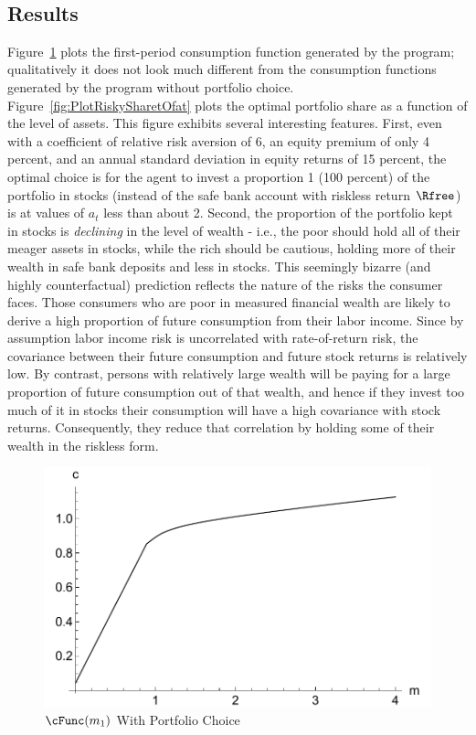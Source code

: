 \documentclass[titlepage, headings=optiontotocandhead]{\econtex}
\begin{document}
\
\subsection{Results}

Figure~\ref{fig:PlotctMultContr} plots the first-period consumption
function generated by the program; qualitatively it does not look much
different from the consumption functions generated by the program
without portfolio choice.  Figure~\ref{fig:PlotRiskySharetOfat} plots the
optimal portfolio share as a function of the level of assets.  This
figure exhibits several interesting features.  First, even with a
coefficient of relative risk aversion of 6, an equity premium of only
4 percent, and an annual standard deviation in equity returns of 15
percent, the optimal choice is for the agent
to invest a proportion 1 (100 percent) of the portfolio in stocks (instead of the safe bank account with riskless return $\Rfree$) is
at values of ${a}_{t}$ less than about 2.  Second, the
proportion of the portfolio kept in stocks is \textit{declining} in the
level of wealth - i.e., the poor should hold all of their meager
assets in stocks, while the rich should be cautious, holding more of
their wealth in safe bank deposits and less in stocks.  This
seemingly bizarre (and highly counterfactual) prediction reflects the
nature of the risks the consumer faces.  Those consumers who are poor
in measured financial wealth are likely to derive a high proportion of
future consumption from their labor income.  Since by assumption labor
income risk is uncorrelated with rate-of-return risk, the covariance
between their future consumption and future stock returns is
relatively low.  By contrast, persons with relatively large wealth
will be paying for a large proportion of future consumption out of that
wealth, and hence if they invest too much of it in stocks their consumption
will have a high covariance with stock returns.  Consequently, they
reduce that correlation by holding some of their wealth in the
riskless form.

\hypertarget{PlotctMultContr}{}
\begin{figure}
  \includegraphics{./Figures/PlotctMultContr}
  \caption{$\cFunc({m}_{1})$ With Portfolio Choice}
  \label{fig:PlotctMultContr}
\end{figure}
\end{document}
